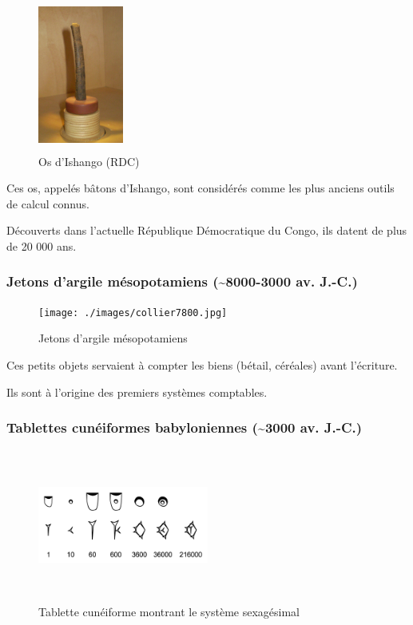 \documentclass[11pt]{article}
\begin{document}
\begin{figure}[htbp]
\centering
\includegraphics[width=0.25\textwidth,height=5cm]{./images/Os-Ishango.jpeg}
\caption{Os d'Ishango (RDC)}
\end{figure}


Ces os, appelés bâtons d'Ishango, sont considérés comme les plus
anciens outils de calcul connus.

Découverts dans l’actuelle République Démocratique du Congo, ils
datent de plus de 20 000 ans.




\subsubsection{Jetons d’argile mésopotamiens (\textasciitilde{}8000-3000 av. J.-C.)}
\label{sec:org7fef889}

\begin{figure}[htbp]
\centering
\texttt{[image: ./images/collier7800.jpg]}
\caption{Jetons d’argile mésopotamiens}
\end{figure}



Ces petits objets servaient à compter les biens (bétail, céréales)
avant l’écriture.

Ils sont à l’origine des premiers systèmes comptables.



\subsubsection{Tablettes cunéiformes babyloniennes (\textasciitilde{}3000 av. J.-C.)}
\label{sec:org198f8f9}

\begin{figure}[htbp]
\centering
\includegraphics[width=0.5\textwidth,height=5cm]{./images/Proto-cuneiform-sexagesimal.png}
\caption{Tablette cunéiforme montrant le système sexagésimal}
\end{figure}
\end{document}
